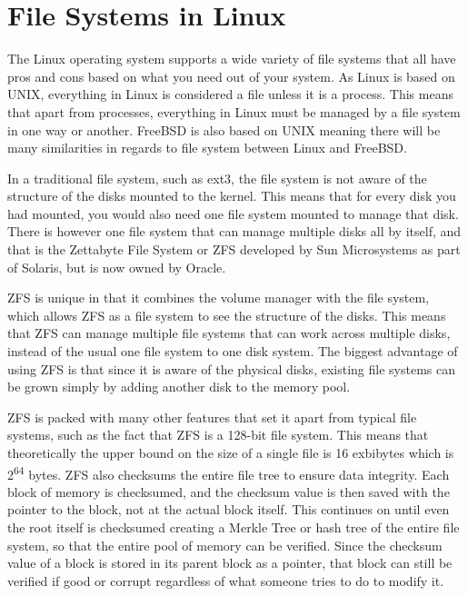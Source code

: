\documentclass[10pt,serif,draftclsnofoot,onecolumn]{IEEEtran}
\begin{document}
	\section{File Systems in Linux}
	\par
			The Linux operating system supports a wide variety of file systems that all have pros and cons based on what you need out of your system. As Linux is based on UNIX, everything in Linux is considered a file unless it is a process. This means that apart from processes, everything in Linux must be managed by a file system in one way or another. FreeBSD is also based on UNIX meaning there will be many similarities in regards to file system between Linux and FreeBSD.
	\newline
	\par
			In a traditional file system, such as ext3, the file system is not aware of the structure of the disks mounted to the kernel. This means that for every disk you had mounted, you would also need one file system mounted to manage that disk. There is however one file system that can manage multiple disks all by itself, and that is the Zettabyte File System or ZFS developed by Sun Microsystems as part of Solaris, but is now owned by Oracle.
	\newline
	\par
			ZFS is unique in that it combines the volume manager with the file system, which allows ZFS as a file system to see the structure of the disks\cite{4}. This means that ZFS can manage multiple file systems that can work across multiple disks, instead of the usual one file system to one disk system. The biggest advantage of using ZFS is that since it is aware of the physical disks, existing file systems can be grown simply by adding another disk to the memory pool\cite{4}.
	\newline
	\par
			ZFS is packed with many other features that set it apart from typical file systems, such as the fact that ZFS is a 128-bit file system. This means that theoretically the upper bound on the size of a single file is 16 exbibytes which is 2\textsuperscript{64} bytes\cite{4}. ZFS also checksums the entire file tree to ensure data integrity. Each block of memory is checksumed, and the checksum value is then saved with the pointer to the block, not at the actual block itself. This continues on until even the root itself is checksumed creating a Merkle Tree or hash tree of the entire file system, so that the entire pool of memory can be verified. Since the checksum value of a block is stored in its parent block as a pointer, that block can still be verified if good or corrupt regardless of what someone tries to do to modify it\cite{4}.
	\newpage


	
	
\end{document}

